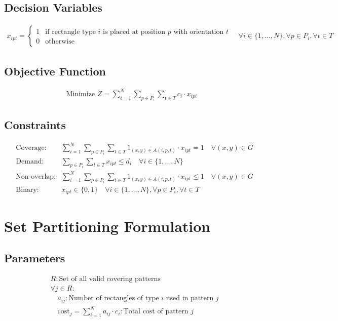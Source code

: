 \documentclass{article}
\begin{document}
\subsection{Decision Variables}
\begin{align*}
x_{ipt} = 
\begin{cases}
1 & \text{if rectangle type } i \text{ is placed at position } p \text{ with orientation } t \\
0 & \text{otherwise}
\end{cases}
\quad \forall i \in \{1,\ldots,N\}, \forall p \in P_i, \forall t \in T
\end{align*}

\subsection{Objective Function}
\begin{align*}
\text{Minimize } Z = \sum_{i=1}^{N} \sum_{p \in P_i} \sum_{t \in T} c_i \cdot x_{ipt}
\end{align*}

\subsection{Constraints}
\begin{align}
&\text{Coverage:} & \sum_{i=1}^{N} \sum_{p \in P_i} \sum_{t \in T} {1}_{(x,y) \in A(i,p,t)} \cdot x_{ipt} = 1 \quad \forall (x,y) \in G \\
&\text{Demand:} & \sum_{p \in P_i} \sum_{t \in T} x_{ipt} \leq d_i \quad \forall i \in \{1, \ldots, N\} \\
&\text{Non-overlap:} & \sum_{i=1}^{N} \sum_{p \in P_i} \sum_{t \in T} {1}_{(x,y) \in A(i,p,t)} \cdot x_{ipt} \leq 1 \quad \forall (x,y) \in G \\
&\text{Binary:} & x_{ipt} \in \{0,1\} \quad \forall i \in \{1,\ldots,N\}, \forall p \in P_i, \forall t \in T
\end{align}

\section{Set Partitioning Formulation}

\subsection{Parameters}
\begin{align*}
& R: \text{Set of all valid covering patterns} \\
& \forall j \in R: \\
& \quad a_{ij}: \text{Number of rectangles of type } i \text{ used in pattern } j \\
& \quad \text{cost}_j = \sum_{i=1}^{N} a_{ij} \cdot c_i: \text{Total cost of pattern } j
\end{align*}
\end{document}
